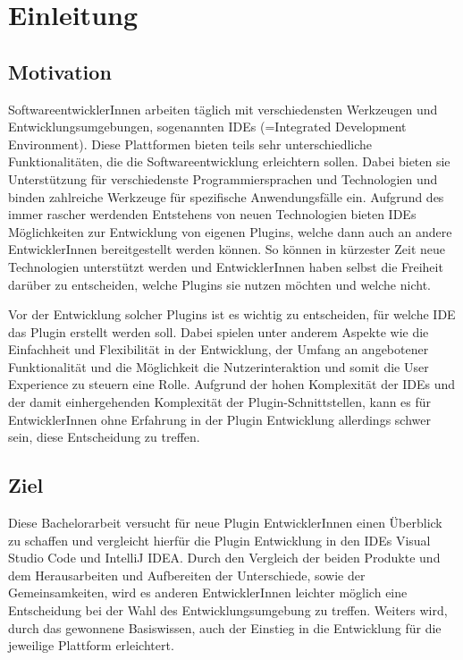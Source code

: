 \chapter{Einleitung}
\label{cha:Einleitung}


\section{Motivation}
\label{sec:Motivation}

SoftwareentwicklerInnen arbeiten täglich mit verschiedensten 
Werkzeugen und Entwicklungsumgebungen, sogenannten IDEs 
(=Integrated Development Environment). Diese Plattformen 
bieten teils sehr unterschiedliche Funktionalitäten, die 
die Softwareentwicklung erleichtern sollen. Dabei bieten 
sie Unterstützung für verschiedenste Programmiersprachen 
und Technologien und binden zahlreiche Werkzeuge für 
spezifische Anwendungsfälle ein. Aufgrund des immer rascher
werdenden Entstehens von neuen Technologien bieten
IDEs Möglichkeiten zur Entwicklung von eigenen 
Plugins, welche dann auch an andere EntwicklerInnen 
bereitgestellt werden können. So können in kürzester 
Zeit neue Technologien unterstützt werden und 
EntwicklerInnen haben selbst die Freiheit darüber zu 
entscheiden, welche Plugins sie nutzen möchten und 
welche nicht.

Vor der Entwicklung solcher Plugins ist es wichtig 
zu entscheiden, für welche IDE das Plugin erstellt 
werden soll. Dabei spielen unter anderem Aspekte wie 
die Einfachheit und Flexibilität in der Entwicklung, 
der Umfang an angebotener Funktionalität und die Möglichkeit
die Nutzerinteraktion und somit die User Experience 
zu steuern eine Rolle. Aufgrund der hohen 
Komplexität der IDEs und der damit einhergehenden 
Komplexität der Plugin-Schnittstellen, kann es für EntwicklerInnen
ohne Erfahrung in der Plugin Entwicklung allerdings schwer sein,
diese Entscheidung zu treffen.

\section{Ziel}
\label{sec:Ziel}

Diese Bachelorarbeit versucht für neue Plugin EntwicklerInnen
einen Überblick zu schaffen und vergleicht hierfür 
die Plugin Entwicklung in den IDEs Visual Studio Code 
und IntelliJ IDEA. Durch den Vergleich der beiden Produkte 
und dem Herausarbeiten und Aufbereiten der Unterschiede, 
sowie der Gemeinsamkeiten, wird es anderen 
EntwicklerInnen leichter möglich eine Entscheidung
bei der Wahl des Entwicklungsumgebung zu treffen.
Weiters wird, durch das gewonnene Basiswissen, auch der Einstieg
in die Entwicklung für die jeweilige Plattform erleichtert.

